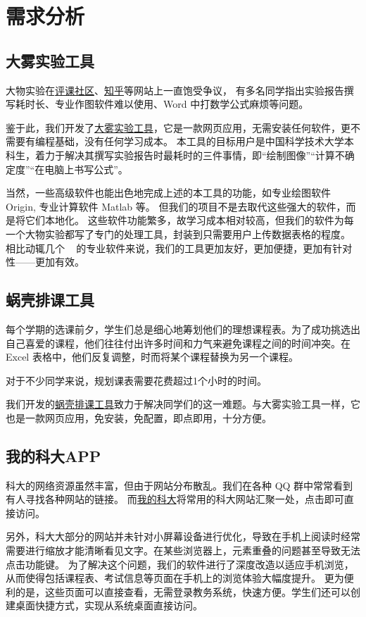 \section{需求分析}

\subsection{大雾实验工具}

大物实验在\href{https://icourse.club/course/12716/}{评课社区}、\href{https://www.zhihu.com/question/35867101}{知乎}等网站上一直饱受争议，
有多名同学指出实验报告撰写耗时长、专业作图软件难以使用、Word 中打数学公式麻烦等问题。

鉴于此，我们开发了\href{https://dawu.feixu.site/}{{大雾实验工具}}，它是一款网页应用，无需安装任何软件，更不需要有编程基础，没有任何学习成本。
本工具的目标用户是中国科学技术大学本科生，着力于解决其撰写实验报告时最耗时的三件事情，即“绘制图像”“计算不确定度”“在电脑上书写公式”。

当然，一些高级软件也能出色地完成上述的本工具的功能，如专业绘图软件 Origin, 专业计算软件 Matlab 等。
但我们的项目不是去取代这些强大的软件，而是将它们{本地化}。
这些软件功能繁多，故学习成本相对较高，但我们的软件为每一个大物实验都写了专门的处理工具，封装到只需要用户上传数据表格的程度。
相比动辄几个 \unit{\giga\byte} 的专业软件来说，我们的工具更加友好，更加便捷，更加有针对性——更加有效。

\subsection{蜗壳排课工具}

每个学期的选课前夕，学生们总是细心地筹划他们的理想课程表。为了成功挑选出自己喜爱的课程，他们往往付出许多时间和力气来避免课程之间的时间冲突。在 Excel 表格中，他们反复调整，时而将某个课程替换为另一个课程。

对于不少同学来说，规划课表需要花费超过1个小时的时间。

我们开发的\href{https://paike.feixu.site/}{{蜗壳排课工具}}致力于解决同学们的这一难题。与大雾实验工具一样，它也是一款网页应用，免安装，免配置，即点即用，十分方便。

\subsection{我的科大APP}

科大的网络资源虽然丰富，但由于网站分布散乱。我们在各种 QQ 群中常常看到有人寻找各种网站的链接。
而\href{https://myustc.feixu.site/}{{我的科大}}将常用的科大网站汇聚一处，点击即可直接访问。

另外，科大大部分的网站并未针对小屏幕设备进行优化，导致在手机上阅读时经常需要进行缩放才能清晰看见文字。在某些浏览器上，元素重叠的问题甚至导致无法点击功能键。
为了解决这个问题，我们的软件进行了深度改造以适应手机浏览，从而使得包括课程表、考试信息等页面在手机上的浏览体验大幅度提升。
更为便利的是，这些页面可以直接查看，无需登录教务系统，快速方便。学生们还可以创建桌面快捷方式，实现从系统桌面直接访问。